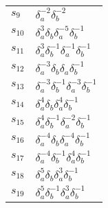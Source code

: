 \documentclass{article}
\begin{document}
\begin{center}
\begin{tabular}{ll}
$s_{9}$ & $\delta_a^{-2}\delta_b^{-2}$ \\
$s_{10}$ & $\delta_a^{3}\delta_b^{}\delta_a^{-5}\delta_b^{-1}$ \\
$s_{11}$ & $\delta_a^{3}\delta_b^{-1}\delta_a^{-1}\delta_b^{-1}$ \\
$s_{12}$ & $\delta_a^{-3}\delta_b^{}\delta_a^{}\delta_b^{-1}$ \\
$s_{13}$ & $\delta_a^{-3}\delta_b^{-1}\delta_a^{-3}\delta_b^{-1}$ \\
$s_{14}$ & $\delta_a^{4}\delta_b^{}\delta_a^{4}\delta_b^{-1}$ \\
$s_{15}$ & $\delta_a^{4}\delta_b^{-1}\delta_a^{-2}\delta_b^{-1}$ \\
$s_{16}$ & $\delta_a^{-4}\delta_b^{}\delta_a^{-4}\delta_b^{-1}$ \\
$s_{17}$ & $\delta_a^{-4}\delta_b^{-1}\delta_a^{4}\delta_b^{-1}$ \\
$s_{18}$ & $\delta_a^{5}\delta_b^{}\delta_a^{3}\delta_b^{-1}$ \\
$s_{19}$ & $\delta_a^{5}\delta_b^{-1}\delta_a^{3}\delta_b^{-1}$ \\
\bottomrule
\end{tabular}
\end{center}

\thispagestyle{empty}
\end{document}
